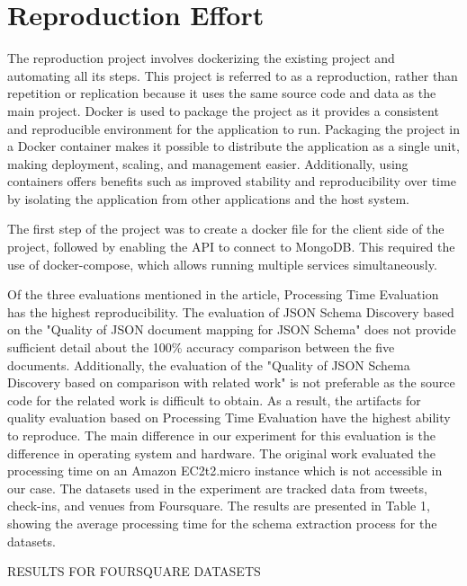 \documentclass[sigconf]{acmart}
\begin{document}
\section*{Reproduction Effort}
The reproduction project involves dockerizing the existing project and automating all its steps. This project is referred to as a reproduction, rather than repetition or replication because it uses the same source code and data as the main project. Docker is used to package the project as it provides a consistent and reproducible environment for the application to run. Packaging the project in a Docker container makes it possible to distribute the application as a single unit, making deployment, scaling, and management easier. Additionally, using containers offers benefits such as improved stability and reproducibility over time by isolating the application from other applications and the host system.

The first step of the project was to create a docker file for the client side of the project, followed by enabling the API to connect to MongoDB. This required the use of docker-compose, which allows running multiple services simultaneously. 

Of the three evaluations mentioned in the article, Processing Time Evaluation has the highest reproducibility. The evaluation of JSON Schema Discovery based on the "Quality of JSON document mapping for JSON Schema" does not provide sufficient detail about the 100\% accuracy comparison between the five documents. Additionally, the evaluation of the "Quality of JSON Schema Discovery based on comparison with related work" is not preferable as the source code for the related work is difficult to obtain. As a result, the artifacts for quality evaluation based on Processing Time Evaluation have the highest ability to reproduce. The main difference in our experiment for this evaluation is the difference in operating system and hardware. The original work evaluated the processing time on an Amazon EC2t2.micro instance which is not accessible in our case. The datasets used in the experiment are tracked data from tweets, check-ins, and venues from Foursquare. The results are presented in Table 1, showing the average processing time for the schema extraction process for the datasets.

\begin{table}
  \caption{RESULTS FOR FOURSQUARE DATASETS}
  \label{tab:freq}
   
\end{table}
\end{document}
